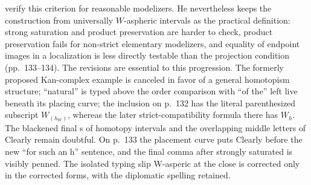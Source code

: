 verify this criterion for reasonable modelizers. He nevertheless keeps the construction from universally $W$-aspheric intervals as the practical definition: strong saturation and product preservation are harder to check, product preservation fails for non-strict elementary modelizers, and equality of endpoint images in a localization is less directly testable than the projection condition (pp.~133--134). The revisions are essential to this progression. The formerly proposed Kan-complex example is canceled in favor of a general homotopism structure; ``natural'' is typed above the order comparison with ``of the'' left live beneath its placing curve; the inclusion on p.~132 has the literal parenthesized subscript $W_{(h_W)}$, whereas the later strict-compatibility formula there has $W_h$. The blackened final s of homotopy intervals and the overlapping middle letters of Clearly remain doubtful. On p.~133 the placement curve puts Clearly before the new ``for such an h'' sentence, and the final comma after strongly saturated is visibly penned. The isolated typing slip W-asperic at the close is corrected only in the corrected forms, with the diplomatic spelling retained.

